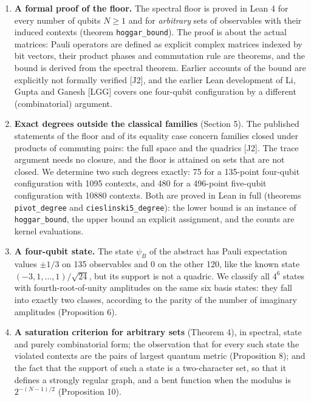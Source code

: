 \documentclass[11pt,a4paper]{article}
\providecommand{\tightlist}{\setlength{\itemsep}{0pt}\setlength{\parskip}{0pt}}
\begin{document}
\begin{enumerate}
\def\labelenumi{\arabic{enumi}.}
\tightlist
\item
  \textbf{A formal proof of the floor.} The spectral floor is proved in Lean 4 for every number of qubits
  \(N \ge 1\) and for \emph{arbitrary} sets of observables with their induced contexts (theorem
  \texttt{hoggar\_bound}). The proof is about the actual matrices: Pauli operators are defined as explicit
  complex matrices indexed by bit vectors, their product phases and commutation rule are theorems, and
  the bound is derived from the spectral theorem. Earlier accounts of the bound are explicitly not
  formally verified {[}J2{]}, and the earlier Lean development of Li, Gupta and Ganesh {[}LGG{]} covers one
  four-qubit configuration by a different (combinatorial) argument.
\item
  \textbf{Exact degrees outside the classical families} (Section 5). The published statements of the floor
  and of its equality case concern families closed under products of commuting pairs: the full space
  and the quadrics {[}J2{]}. The trace argument needs no closure, and the floor is attained on sets that are
  not closed. We determine two such degrees exactly: 75 for a 135-point four-qubit configuration with
  1095 contexts, and 480 for a 496-point five-qubit configuration with 10880 contexts. Both are
  proved in Lean in full (theorems \texttt{pivot\_degree} and \texttt{cieslinski5\_degree}): the lower bound is an
  instance of \texttt{hoggar\_bound}, the upper bound an explicit assignment, and the counts are kernel
  evaluations.
\item
  \textbf{A four-qubit state.} The state \(\psi_B\) of the abstract has Pauli expectation values \(\pm 1/3\) on
  135 observables and \(0\) on the other 120, like the known state \((-3,1,\dots,1)/\sqrt{24}\), but its
  support is not a quadric. We classify all \(4^6\) states with fourth-root-of-unity amplitudes on the
  same six basis states: they fall into exactly two classes, according to the parity of the number of
  imaginary amplitudes (Proposition 6).
\item
  \textbf{A saturation criterion for arbitrary sets} (Theorem 4), in spectral, state and purely combinatorial
  form; the observation that for every such state the violated contexts are the pairs of largest
  quantum metric (Proposition 8); and the fact that the support of such a state is a two-character
  set, so that it defines a strongly regular graph, and a bent function when the modulus is
  \(2^{-(N-1)/2}\) (Proposition 10).

\end{enumerate}
\end{document}

